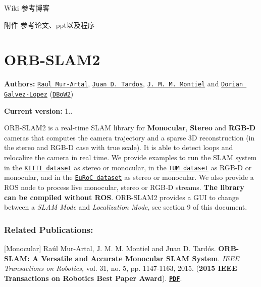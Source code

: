 
\begin{DoxyItemize}
\item Wiki 参考博客
\item 附件 参考论文、ppt以及程序
\end{DoxyItemize}

\section*{O\+R\+B-\/\+S\+L\+A\+M2}

{\bfseries Authors\+:} \href{http://webdiis.unizar.es/~raulmur/}{\tt Raul Mur-\/\+Artal}, \href{http://webdiis.unizar.es/~jdtardos/}{\tt Juan D. Tardos}, \href{http://webdiis.unizar.es/~josemari/}{\tt J. M. M. Montiel} and \href{http://doriangalvez.com/}{\tt Dorian Galvez-\/\+Lopez} (\href{https://github.com/dorian3d/DBoW2}{\tt D\+Bo\+W2})

{\bfseries Current version\+:} 1..

O\+R\+B-\/\+S\+L\+A\+M2 is a real-\/time S\+L\+AM library for {\bfseries Monocular}, {\bfseries Stereo} and {\bfseries R\+G\+B-\/D} cameras that computes the camera trajectory and a sparse 3D reconstruction (in the stereo and R\+G\+B-\/D case with true scale). It is able to detect loops and relocalize the camera in real time. We provide examples to run the S\+L\+AM system in the \href{http://www.cvlibs.net/datasets/kitti/eval_odometry.php}{\tt K\+I\+T\+TI dataset} as stereo or monocular, in the \href{http://vision.in.tum.de/data/datasets/rgbd-dataset}{\tt T\+UM dataset} as R\+G\+B-\/D or monocular, and in the \href{http://projects.asl.ethz.ch/datasets/doku.php?id=kmavvisualinertialdatasets}{\tt Eu\+RoC dataset} as stereo or monocular. We also provide a R\+OS node to process live monocular, stereo or R\+G\+B-\/D streams. {\bfseries The library can be compiled without R\+OS}. O\+R\+B-\/\+S\+L\+A\+M2 provides a G\+UI to change between a {\itshape S\+L\+AM Mode} and {\itshape Localization Mode}, see section 9 of this document.

\href{https://www.youtube.com/embed/ufvPS5wJAx0}{\tt }

\subsubsection*{Related Publications\+:}

\mbox{[}Monocular\mbox{]} Raúl Mur-\/\+Artal, J. M. M. Montiel and Juan D. Tardós. {\bfseries O\+R\+B-\/\+S\+L\+AM\+: A Versatile and Accurate Monocular S\+L\+AM System}. {\itshape I\+E\+EE Transactions on Robotics,} vol. 31, no. 5, pp. 1147-\/1163, 2015. ({\bfseries 2015 I\+E\+EE Transactions on Robotics Best Paper Award}). {\bfseries \href{http://webdiis.unizar.es/~raulmur/MurMontielTardosTRO15.pdf}{\tt P\+DF}}.

